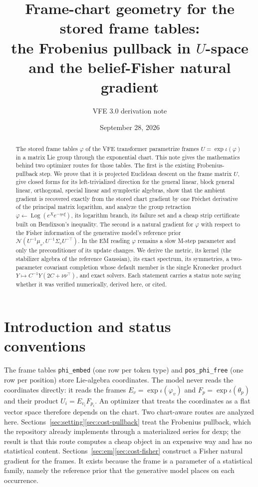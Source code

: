 \documentclass[11pt]{article}
\title{Frame-chart geometry for the stored frame tables:\\
the Frobenius pullback in $U$-space and the belief-Fisher natural gradient}
\author{VFE 3.0 derivation note}
\date{September 28, 2026}
\theoremstyle{definition}
\theoremstyle{remark}
\newcommand{\Log}{\operatorname{Log}}
\newcommand{\Normal}{\mathcal{N}}
\newcommand{\ndash}{\textendash}
\begin{document}
\maketitle

\begin{abstract}
The stored frame tables $\varphi$ of the VFE transformer parametrize frames $U=\exp\iota(\varphi)$ in a matrix Lie group through the exponential chart. This note gives the mathematics behind two optimizer routes for those tables. The first is the existing Frobenius-pullback step. We prove that it is projected Euclidean descent on the frame matrix $U$, give closed forms for its left-trivialized direction for the general linear, block general linear, orthogonal, special linear and symplectic algebras, show that the ambient gradient is recovered exactly from the stored chart gradient by one Fr\'echet derivative of the principal matrix logarithm, and analyze the group retraction $\varphi\leftarrow\Log(e^{X}e^{-\eta s\xi})$, its logarithm branch, its failure set and a cheap strip certificate built on Bendixson's inequality. The second is a natural gradient for $\varphi$ with respect to the Fisher information of the generative model's reference prior $\Normal(U^{-1}\mu_v,U^{-1}\Sigma_vU^{-\top})$. In the EM reading $\varphi$ remains a slow M-step parameter and only the preconditioner of its update changes. We derive the metric, its kernel (the stabilizer algebra of the reference Gaussian), its exact spectrum, its symmetries, a two-parameter covariant completion whose default member is the single Kronecker product $Y\mapsto C^{-1}Y(2C+\nu\nu^\top)$, and exact solvers. Each statement carries a status note saying whether it was verified numerically, derived here, or cited.
\end{abstract}

\tableofcontents

\section{Introduction and status conventions}\label{sec:intro}

The frame tables \texttt{phi\_embed} (one row per token type) and \texttt{pos\_phi\_free} (one row per position) store Lie-algebra coordinates. The model never reads the coordinates directly: it reads the frames $E_v=\exp\iota(\varphi_v)$ and $F_p=\exp\iota(\theta_p)$ and their product $U_i=E_{v_i}F_{p_i}$. An optimizer that treats the coordinates as a flat vector space therefore depends on the chart. Two chart-aware routes are analyzed here. Sections~\ref{sec:setting}\ndash\ref{sec:cost-pullback} treat the Frobenius pullback, which the repository already implements through a materialized series for $\mathrm{dexp}$; the result is that this route computes a cheap object in an expensive way and has no statistical content. Sections~\ref{sec:em}\ndash\ref{sec:cost-fisher} construct a Fisher natural gradient for the frames. It exists because the frame is a parameter of a statistical family, namely the reference prior that the generative model places on each occurrence.
\end{document}
